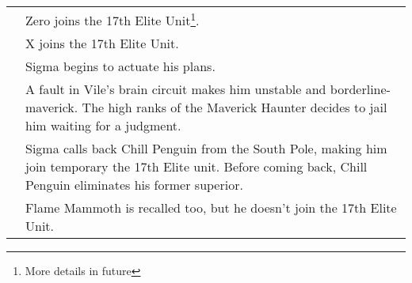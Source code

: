 \begin{tabularx}{\linewidth}{l X}
	\tabdot& Zero joins the 17th Elite Unit\footnote{More details in future}.\\
	\tabdot& X joins the 17th Elite Unit.\\
	\tabdot& Sigma begins to actuate his plans.\\
	\tabdot& A fault in Vile's brain circuit makes him unstable and borderline-maverick. The high ranks of the Maverick Haunter decides to jail him waiting for a judgment.\\
	\tabdot& Sigma calls back Chill Penguin from the South Pole, making him join temporary the 17th Elite unit. Before coming back, Chill Penguin eliminates his former superior.\\
	\tabdot& Flame Mammoth is recalled too, but he doesn't join the 17th Elite Unit.\\
	

\end{tabularx}
